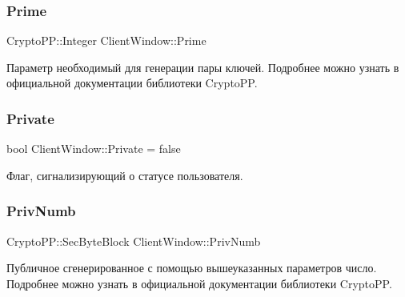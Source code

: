 \mbox{\label{class_client_window_aab318f5417f89201dc6633b2e481e817}} 
\subsubsection{\texorpdfstring{Prime}{Prime}}
{\footnotesize\ttfamily Crypto\+P\+P\+::\+Integer Client\+Window\+::\+Prime\hspace{0.3cm}{\ttfamily [private]}}



Параметр необходимый для генерации пары ключей. Подробнее можно узнать в официальной документации библиотеки Crypto\+PP. 

\mbox{\label{class_client_window_a0112c19a3296b1908e823d9baaa2246b}} 
\subsubsection{\texorpdfstring{Private}{Private}}
{\footnotesize\ttfamily bool Client\+Window\+::\+Private = false\hspace{0.3cm}{\ttfamily [private]}}



Флаг, сигнализирующий о статусе пользователя. 

\mbox{\label{class_client_window_a4c4248eb0be6db957bbd835146e36699}} 
\subsubsection{\texorpdfstring{Priv\+Numb}{PrivNumb}}
{\footnotesize\ttfamily Crypto\+P\+P\+::\+Sec\+Byte\+Block Client\+Window\+::\+Priv\+Numb\hspace{0.3cm}{\ttfamily [private]}}



Публичное сгенерированное с помощью вышеуказанных параметров число. Подробнее можно узнать в официальной документации библиотеки Crypto\+PP. 

\mbox{\label{class_client_window_a213087869fc5bfb7427add5248e60046}} 
